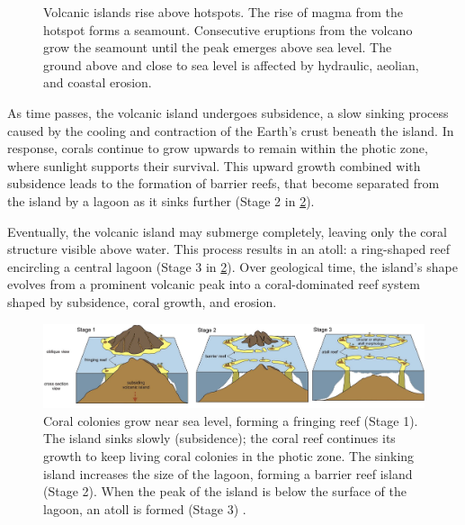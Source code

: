 \begin{figure}
    \caption[Volcanic island formation process]{Volcanic islands rise above hotspots. The rise of magma from the hotspot forms a seamount. Consecutive eruptions from the volcano grow the seamount until the peak emerges above sea level. The ground above and close to sea level is affected by hydraulic, aeolian, and coastal erosion.}
    \label{fig:coral-island-island-growth}
\end{figure}

As time passes, the volcanic island undergoes subsidence, a slow sinking process caused by the cooling and contraction of the Earth's crust beneath the island. In response, corals continue to grow upwards to remain within the photic zone, where sunlight supports their survival. This upward growth combined with subsidence leads to the formation of barrier reefs, that become separated from the island by a lagoon as it sinks further (Stage 2 in \cref{fig:coral-island-reef-growth}).

Eventually, the volcanic island may submerge completely, leaving only the coral structure visible above water. This process results in an atoll: a ring-shaped reef encircling a central lagoon (Stage 3 in \cref{fig:coral-island-reef-growth}). Over geological time, the island's shape evolves from a prominent volcanic peak into a coral-dominated reef system shaped by subsidence, coral growth, and erosion.

\begin{figure}
    \includegraphics[width = \linewidth]{other_images/Drawings/Darwin_corals-color-Terry2012.jpg}
    \caption[Darwin's subsidence theory]{Coral colonies grow near sea level, forming a fringing reef (Stage 1). The island sinks slowly (subsidence); the coral reef continues its growth to keep living coral colonies in the photic zone. The sinking island increases the size of the lagoon, forming a barrier reef island (Stage 2). When the peak of the island is below the surface of the lagoon, an atoll is formed (Stage 3) \cite{Terry2013}.}
    \label{fig:coral-island-reef-growth}
\end{figure}

